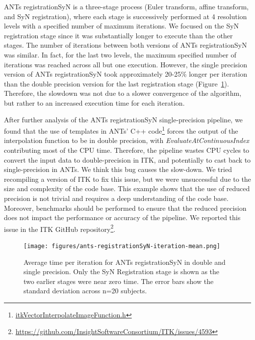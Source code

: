 \documentclass[conference]{IEEEtran}
\begin{document}
ANTs registrationSyN is a three-stage process (Euler transform, affine transform, and SyN registration), where each stage is successively performed at 4 resolution levels with a specified number of maximum iterations. We focused on the SyN registration stage since it was substantially longer to execute than the other stages. The number of iterations between both versions of ANTs registrationSyN was similar. In fact, for the last two levels, the maximum specified number of iterations was reached across all but one execution. However, the single precision version of ANTs registrationSyN took approximately 20-25\% longer per iteration than the double precision version for the last registration stage (Figure~\ref{fig:mean-time-per-iteration-ants}). Therefore, the slowdown was not due to a slower convergence of the algorithm, but rather to an increased execution time for each iteration.

After further analysis of the ANTs registrationSyN single-precision pipeline, we found that the use of templates in ANTs' C++ code\footnote{\href{https://github.com/InsightSoftwareConsortium/ITK/blob/d9c585d96359bf304ad3047148cee81bf27ac0c1/Modules/Core/ImageFunction/include/itkVectorInterpolateImageFunction.h\#L46-L48}{itkVectorInterpolateImageFunction.h}} forces the output of the interpolation function to be in double precision, with \textit{EvaluateAtContinuousIndex} contributing most of the CPU time. Therefore, the pipeline wastes CPU cycles to convert the input data to double-precision in ITK, and potentially to cast back to single-precision in ANTs. We think this bug causes the slow-down. We tried recompiling a version of ITK to fix this issue, but we were unsuccessful due to the size and complexity of the code base. This example shows that the use of reduced precision is not trivial and requires a deep understanding of the code base. Moreover, benchmarks should be performed to ensure that the reduced precision does not impact the performance or accuracy of the pipeline. We reported this issue in the ITK GitHub repository\footnote{\href{https://github.com/InsightSoftwareConsortium/ITK/issues/4593}{https://github.com/InsightSoftwareConsortium/ITK/issues/4593}}.

\begin{figure}
	\texttt{[image: figures/ants-registrationSyN-iteration-mean.png]}
	\caption{Average time per iteration for ANTs registrationSyN in double and single precision. Only the SyN Registration stage is shown as the two earlier stages were near zero time. The error bars show the standard deviation across n=20 subjects.}
	\label{fig:mean-time-per-iteration-ants}
\end{figure}
						
\end{document}
